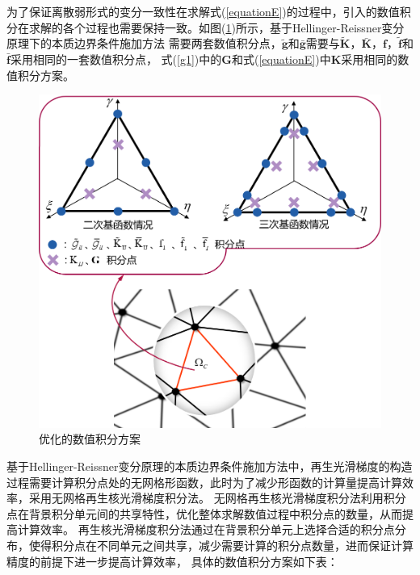 为了保证离散弱形式的变分一致性在求解式(\ref{equationE})的过程中，引入的数值积分在求解的各个过程也需要保持一致。如图(\ref{Eintegralscheme})所示，基于Hellinger-Reissner变分原理下的本质边界条件施加方法
需要两套数值积分点\cite{}，$\tilde{\pmb g}$和$\bar{\pmb g}$需要与$\tilde{\pmb{K}}$，$\bar{\pmb{K}}$，$\pmb{f}$，$\tilde{\pmb{f}}$和$\bar{\pmb{f}}$采用相同的一套数值积分点，
式(\ref{g1})中的$\pmb{G}$和式(\ref{equationE})中$\pmb{K}$采用相同的数值积分方案。\par
\begin{figure}[H]
    \centering
    \includegraphics[scale=0.6]{figure/EHR/Eintegralscheme.png}
    \caption{优化的数值积分方案}\label{Eintegralscheme}
\end{figure}
基于Hellinger-Reissner变分原理的本质边界条件施加方法中，再生光滑梯度的构造过程需要计算积分点处的无网格形函数，此时为了减少形函数的计算量提高计算效率，采用无网格再生核光滑梯度积分法。
无网格再生核光滑梯度积分法\cite{}利用积分点在背景积分单元间的共享特性，优化整体求解数值过程中积分点的数量，从而提高计算效率。
再生核光滑梯度积分法通过在背景积分单元上选择合适的积分点分布，使得积分点在不同单元之间共享，减少需要计算的积分点数量，进而保证计算精度的前提下进一步提高计算效率，
具体的数值积分方案如下表：
